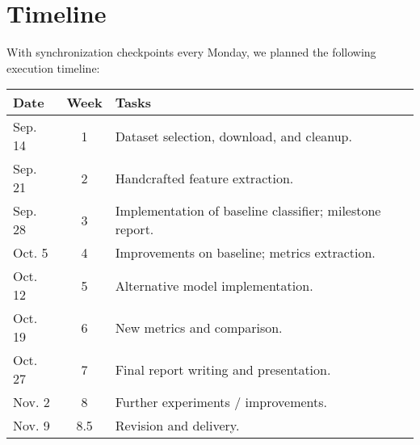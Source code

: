 \section{Timeline}

With synchronization checkpoints every Monday, we planned the following execution timeline:

\begin{table}[H]
\begin{tabular}{lcl}
\textbf{Date} & \multicolumn{1}{l}{\textbf{Week}} & \textbf{Tasks}                                           \\ \hline
Sep. 14       & 1                                 & Dataset selection, download, and cleanup.                \\
Sep. 21       & 2                                 & Handcrafted feature extraction.                          \\
Sep. 28       & 3                                 & Implementation of baseline classifier; milestone report. \\
Oct. 5        & 4                                 & Improvements on baseline; metrics extraction.            \\
Oct. 12       & 5                                 & Alternative model implementation.                        \\
Oct. 19       & 6                                 & New metrics and comparison.                              \\
Oct. 27       & 7                                 & Final report writing and presentation.                   \\
Nov. 2        & 8                                 & Further experiments / improvements.                      \\
Nov. 9        & 8.5                               & Revision and delivery.                                  
\end{tabular}
\end{table}
